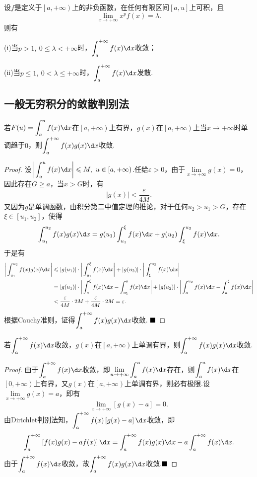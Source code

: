 \begin{corollary}[Cauchy判别法的极限形式]
	设$f$是定义于$\left[a,+\infty\right)$上的非负函数，在任何有限区间$\left[a,u\right]$上可积，且
	$$\lim\limits_{x\to +\infty}x^pf(x)=\lambda.$$
	则有
	
	(i)当$p>1,\ 0\leqslant\lambda<+\infty$时，$\displaystyle\int_{a}^{+\infty}f(x)\d x$收敛；
	
	(ii)当$p\leqslant 1,\ 0<\lambda\leqslant +\infty$时，$\displaystyle\int_{a}^{+\infty}f(x)\d x$发散.
\end{corollary}
\subsection{一般无穷积分的敛散判别法}
\begin{theorem}[Dirichlet判别法]
	若$F(u)=\displaystyle\int_{a}^{u}f(x)\d x$在$\left[a,+\infty\right)$上有界，$g(x)$在$\left[a,+\infty\right)$上当$x\to +\infty$时单调趋于$0$，则$\displaystyle\int_{a}^{+\infty}f(x)g(x)\d x$收敛.
\end{theorem}
\begin{proof}
	设$\bigg|\displaystyle\int_{a}^{u}f(x)\d x\bigg|\leqslant M,\ u\in\left[a,+\infty\right)$.任给$\varepsilon>0$，由于$\lim\limits_{x\to +\infty}g(x)=0$，因此存在$G\geqslant a$，当$x>G$时，有
	$$|g(x)|<\frac{\varepsilon}{4M}.$$
	又因为$g$是单调函数，由积分第二中值定理的推论，对于任何$u_2>u_1>G$，存在$\xi\in\left[u_1,u_2\right]$，使得
	$$\int_{u_1}^{u_2}f(x)g(x)\d x=g(u_1)\int_{u_1}^{\xi}f(x)\d x+g(u_2)\int_{\xi}^{u_2}f(x)\d x.$$
	于是有
	\begin{align*}
		\bigg|\int_{u_1}^{u_2}f(x)g(x)\d x\bigg|
		&\leqslant|g(u_1)|\cdot\bigg|\int_{u_1}^{\xi}f(x)\d x\bigg|+|g(u_2)|\cdot\bigg|\int_{\xi}^{u_2}f(x)\d x\bigg|\\
		&=|g(u_1)|\cdot\bigg|\int_{a}^{\xi}f(x)\d x-\int_{u_1}^{a}f(x)\d x\bigg|+|g(u_2)|\cdot\bigg|\int_{a}^{u_2}f(x)\d x-\int_{a}^{\xi}f(x)\d x\bigg|\\
		&<\frac{\varepsilon}{4M}\cdot 2M+\frac{\varepsilon}{4M}\cdot 2M=\varepsilon.
	\end{align*}
	根据Cauchy准则，证得$\displaystyle\int_{a}^{+\infty}f(x)g(x)\d x$收敛.
	$\hfill\blacksquare$
\end{proof}
\begin{theorem}[Abel判别法]
	若$\displaystyle\int_{a}^{+\infty}f(x)\d x$收敛，$g(x)$在$\left[a,+\infty\right)$上单调有界，则$\displaystyle\int_{a}^{+\infty}f(x)g(x)\d x$收敛.
\end{theorem}
\begin{proof}
	由于$\displaystyle\int_{a}^{+\infty}f(x)\d x$收敛，即$\lim\limits_{u\to +\infty}\displaystyle\int_{a}^{u}f(x)\d x$存在，则$\displaystyle\int_{a}^{u}f(x)\d x$在$\left[0,+\infty\right)$上有界，又$g(x)$在$\left[a,+\infty\right)$上单调有界，则必有极限.设$\lim\limits_{x\to +\infty}g(x)=a$，即有
	$$\lim\limits_{x\to +\infty}\left[g(x)-a\right]=0.$$
	由Dirichlet判别法知，$\displaystyle\int_{a}^{+\infty}f(x)\left[g(x)-a\right]\d x$收敛，即
	$$\displaystyle\int_{a}^{+\infty}\left[f(x)g(x)-af(x)\right]\d x=\displaystyle\int_{a}^{+\infty}f(x)g(x)\d x-a\displaystyle\int_{a}^{+\infty}f(x)\d x.$$
	由于$\displaystyle\int_{a}^{+\infty}f(x)\d x$收敛，故$\displaystyle\int_{a}^{+\infty}f(x)g(x)\d x$收敛.$\hfill\blacksquare$
\end{proof}
